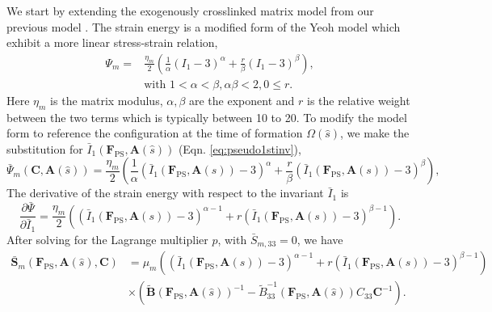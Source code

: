 	We start by extending the exogenously crosslinked matrix model from our previous model \cite{sacks_novel_2016}. The strain energy is a modified form of the Yeoh model which exhibit a more linear stress-strain relation,
\begin{equation}
\begin{split}
\Psi_m = &\frac{\eta_m}{2} \left( \frac{1}{\alpha}\left( I_1 -3\right)^{\alpha} + \frac{r}{\beta} \left( I_1 -3\right)^{\beta} \right), \\
&\text{with } 1<\alpha<\beta, \alpha\beta <2, 0 \leq r.
\end{split}
\end{equation}
Here $\eta_m$ is the matrix modulus, $\alpha,\beta$ are the exponent and $r$ is the relative weight between the two terms which is typically between 10 to 20. To modify the model form to reference the configuration at the time of formation $\Omega(\hat{s})$, we make the substitution for $\bar{I}_1(\mathbf{F}_\mathrm{PS}, \mathbf{A}(\hat{s}))$ (Eqn. \ref{eq:pseudo1stinv}),
\begin{equation} \label{eq:matrixenergyform}
\bar{\Psi}_m\left( \mathbf{C}, \mathbf{A}(\hat{s})\right) = \frac{\eta_m}{2} \left(\frac{1}{\alpha} \left( \bar{I}_1\left(\mathbf{F}_\mathrm{PS}, \mathbf{A}(s)\right) -3\right)^\alpha +\frac{r}{\beta} \left( \bar{I}_1\left(\mathbf{F}_\mathrm{PS}, \mathbf{A}(s)\right) -3\right)^\beta \right),
\end{equation}
The derivative of the strain energy with respect to the invariant $\bar{I}_1$ is 
\begin{equation}
\frac{\partial \bar{\Psi}}{\partial \bar{I}_1} =	\frac{\eta_m}{2} \left(\left( \bar{I}_1\left(\mathbf{F}_\mathrm{PS}, \mathbf{A}(s)\right)- 3\right)^{\alpha - 1} + r \left( \bar{I}_1\left(\mathbf{F}_\mathrm{PS}, \mathbf{A}(s)\right) - 3\right)^{\beta - 1}\right).
\end{equation}
After solving for the Lagrange multiplier $p$, with $\bar{S}_{m,33} = 0$, we have 
\begin{equation}\label{eq:matrixfinal}
\begin{split}
\mathbf{\bar{S}}_m \left( \mathbf{F}_\mathrm{PS},\mathbf{A}(\hat{s}),\mathbf{C}\right) &= \mu_m \left(\left( \bar{I}_1\left(\mathbf{F}_\mathrm{PS}, \mathbf{A}(s)\right) - 3\right)^{\alpha - 1} + r \left( \bar{I}_1\left(\mathbf{F}_\mathrm{PS}, \mathbf{A}(s)\right) - 3\right)^{\beta - 1}\right) \\
&\times \left( \mathbf{\tilde{B}}(\mathbf{F}_\mathrm{PS}, \mathbf{A}(\hat{s}))^{-1} - \tilde{B}_{33}^{-1}(\mathbf{F}_\mathrm{PS}, \mathbf{A}(\hat{s}))C_{33}\mathbf{C}^{-1}\right).
\end{split}
\end{equation}

